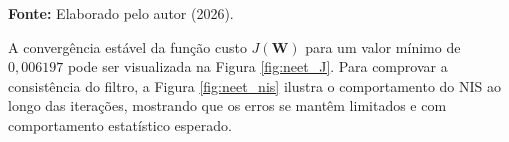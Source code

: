 \documentclass[journal]{IEEEtran}
\begin{document}
\begin{table}[H]
\centering
\caption{Resultados da Estimação Adaptativa: Caso Neethling \cite{Neethling1974}}
\label{tab:resultado_neethling}
\vspace{1pt}
    \centerline{\footnotesize \textbf{Fonte:} Elaborado pelo autor (2026).}
\end{table}
A convergência estável da função custo $J(\mathbf{W})$ para um valor mínimo de $0,006197$ pode ser visualizada na Figura \ref{fig:neet_J}. Para comprovar a consistência do filtro, a Figura \ref{fig:neet_nis} ilustra o comportamento do NIS ao longo das iterações, mostrando que os erros se mantêm limitados e com comportamento estatístico esperado.
\end{document}
